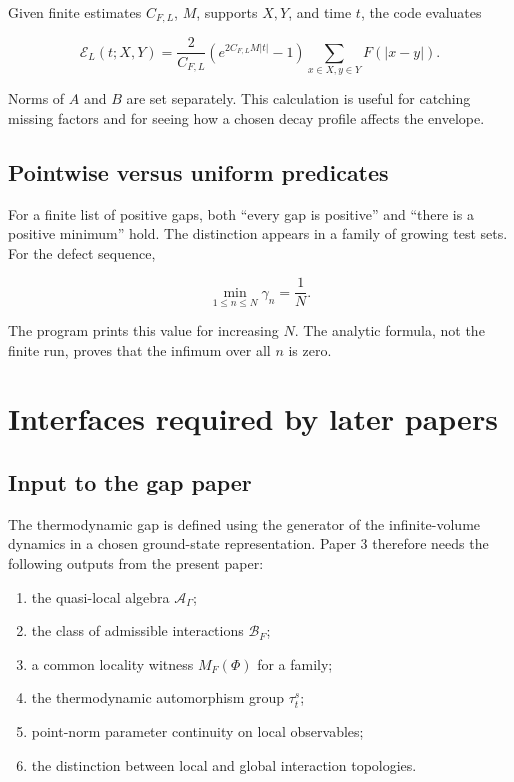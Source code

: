 \documentclass[12pt]{article}
\theoremstyle{definition}
\theoremstyle{remark}
\newcommand{\Alg}{\mathcal A}
\begin{document}
Given finite estimates $C_{F,L}$, $M$, supports $X,Y$, and time $t$, the code
evaluates

\begin{equation}
  \mathcal E_L(t;X,Y)
  =\frac{2}{C_{F,L}}
  \left(e^{2C_{F,L}M|t|}-1\right)
  \sum_{x\in X,y\in Y}F(|x-y|).
\end{equation}

Norms of $A$ and $B$ are set separately.  This calculation is useful for
catching missing factors and for seeing how a chosen decay profile affects
the envelope.

\subsection{Pointwise versus uniform predicates}

For a finite list of positive gaps, both ``every gap is positive'' and
``there is a positive minimum'' hold.  The distinction appears in a family
of growing test sets.  For the defect sequence,

\begin{equation}
  \min_{1\le n\le N}\gamma_n=\frac1N.
\end{equation}

The program prints this value for increasing $N$.  The analytic formula, not
the finite run, proves that the infimum over all $n$ is zero.

\section{Interfaces required by later papers}

\subsection{Input to the gap paper}

The thermodynamic gap is defined using the generator of the infinite-volume
dynamics in a chosen ground-state representation.  Paper 3 therefore needs
the following outputs from the present paper:

\begin{enumerate}[leftmargin=2.3em]
\item the quasi-local algebra $\Alg_\Gamma$;
\item the class of admissible interactions $\mathcal B_F$;
\item a common locality witness $M_F(\Phi)$ for a family;
\item the thermodynamic automorphism group $\tau_t^s$;
\item point-norm parameter continuity on local observables;
\item the distinction between local and global interaction topologies.
\end{enumerate}
\end{document}
